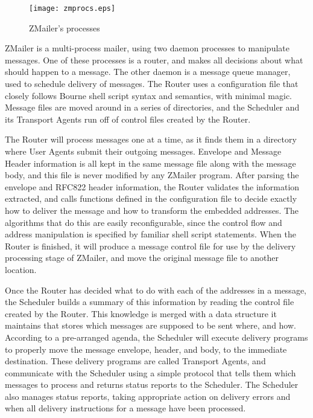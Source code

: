 \begin{figure}[ht]
  \centering
  \texttt{[image: zmprocs.eps]}
  \caption{\label{fig:zmprocs}ZMailer's processes}
\end{figure}


ZMailer is a multi-process mailer, using two daemon processes to manipulate
messages.  One of these processes is a router, and makes all decisions
about what should happen to a message.  The other daemon is a message queue
manager, used to schedule delivery of messages.  The Router uses a
configuration file that closely follows Bourne shell script syntax and
semantics, with minimal magic.  Message files are moved around in a series
of directories, and the Scheduler and its Transport Agents run off of
control files created by the Router.

The Router will process messages one at a time, as it finds them in a
directory where User Agents submit their outgoing messages.  Envelope and
Message Header information is all kept in the same message file along with
the message body, and this file is never modified by any ZMailer program.
After parsing the envelope and RFC822 header information, the Router
validates the information extracted, and calls functions defined in the
configuration file to decide exactly how to deliver the message and how to
transform the embedded addresses.  The algorithms that do this are easily
reconfigurable, since the control flow and address manipulation is
specified by familiar shell script statements.  When the Router is
finished, it will produce a message control file for use by the delivery
processing stage of ZMailer, and move the original message file to another
location.


Once the Router has decided what to do with each of the addresses in a
message, the Scheduler builds a summary of this information by reading the
control file created by the Router.  This knowledge is merged with a data
structure it maintains that stores which messages are supposed to be sent
where, and how.  According to a pre-arranged agenda, the Scheduler will
execute delivery programs to properly move the message envelope, header,
and body, to the immediate destination.  These delivery programs are called
Transport Agents, and communicate with the Scheduler using a simple
protocol that tells them which messages to process and returns status
reports to the Scheduler.  The Scheduler also manages status reports,
taking appropriate action on delivery errors and when all delivery
instructions for a message have been processed.

